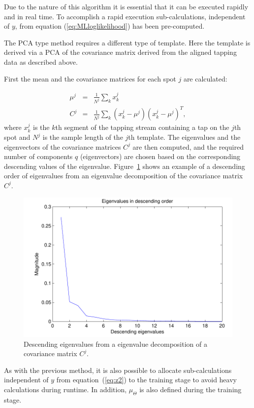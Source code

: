 Due to the nature of this algorithm it is essential that it can be executed rapidly and in real time. To accomplish a rapid execution sub-calculations, independent of $y$, from equation (\ref{eq:MLloglikelihood}) has been pre-computed.

The PCA type method requires a different type of template. Here the template is derived via a PCA of the covariance matrix derived from the aligned tapping data as described above.

First the mean and the covariance matrices for each spot $j$ are calculated:

\begin{eqnarray}\nonumber
\mu^j &=& \frac{1}{N^j} \sum_k x^j_k \\\label{eq:PCAcovariance}
C^j &=& \frac{1}{N^j}\sum_k \left(x^j_k - \mu^j\right)\left(x^j_k - \mu^j\right)^T,
\end{eqnarray}
where $x^j_k$ is the $k$th segment of the tapping stream containing a tap on the $j$th spot and $N^j$ is the sample length of the $j$th template. The eigenvalues and the eigenvectors of the covariance matrices $C^j$ are then computed, and the required number of components $q$ (eigenvectors) are chosen based on the corresponding descending values of the eigenvalue. Figure~\ref{fig:eigenvalues} shows an example of a descending order of eigenvalues from an eigenvalue decomposition of the covariance matrix $C^j$.

\begin{figure}[!]
\centering
\includegraphics[width=120mm]{eigenvalues.pdf}
\caption{Descending eigenvalues from a eigenvalue decomposition of a covariance matrix $C^j$.}\label{fig:eigenvalues}
\end{figure}

As with the previous method, it is also possible to allocate sub-calculations independent of $y$ from equation~(\ref{eq:z2}) to the training stage to avoid heavy calculations during runtime. In addition, $\mu_\Theta$ is also defined during the training stage.

